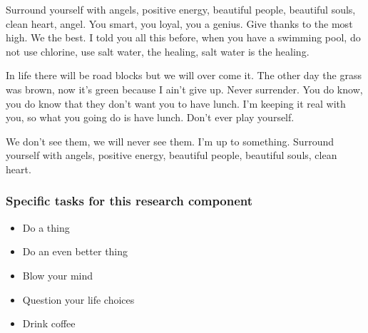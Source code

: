 Surround yourself with angels, positive energy, beautiful people, beautiful souls, clean heart, angel. You smart, you loyal, you a genius. Give thanks to the most high. We the best. I told you all this before, when you have a swimming pool, do not use chlorine, use salt water, the healing, salt water is the healing.

In life there will be road blocks but we will over come it. The other day the grass was brown, now it's green because I ain't give up. Never surrender. You do know, you do know that they don't want you to have lunch. I'm keeping it real with you, so what you going do is have lunch. Don't ever play yourself. 

We don't see them, we will never see them. I'm up to something. Surround yourself with angels, positive energy, beautiful people, beautiful souls, clean heart.


\subsubsection{Specific tasks for this research component}
\begin{itemize}
\setlength\itemsep{0em}
\item Do a thing
\item Do an even better thing
\item Blow your mind
\item Question your life choices
\item Drink coffee
\end{itemize}

